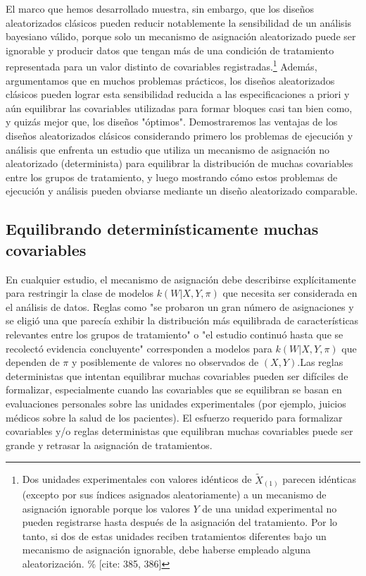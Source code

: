 \documentclass[12pt,a4paper]{article}
\begin{document}
El marco que hemos desarrollado muestra, sin embargo, que los diseños aleatorizados clásicos pueden reducir notablemente la sensibilidad de un análisis bayesiano válido, porque solo un mecanismo de asignación aleatorizado puede ser ignorable y producir datos que tengan más de una condición de tratamiento representada para un valor distinto de covariables registradas.\footnote{Dos unidades experimentales con valores idénticos de $\tilde{X}_{(1)}$ parecen idénticas (excepto por sus índices asignados aleatoriamente) a un mecanismo de asignación ignorable porque los valores $Y$ de una unidad experimental no pueden registrarse hasta después de la asignación del tratamiento. Por lo tanto, si dos de estas unidades reciben tratamientos diferentes bajo un mecanismo de asignación ignorable, debe haberse empleado alguna aleatorización. \% [cite: 385, 386]} Además, argumentamos que en muchos problemas prácticos, los diseños aleatorizados clásicos pueden lograr esta sensibilidad reducida a las especificaciones a priori y aún equilibrar las covariables utilizadas para formar bloques casi tan bien como, y quizás mejor que, los diseños "óptimos". Demostraremos las ventajas de los diseños aleatorizados clásicos considerando primero los problemas de ejecución y análisis que enfrenta un estudio que utiliza un mecanismo de asignación no aleatorizado (determinista) para equilibrar la distribución de muchas covariables entre los grupos de tratamiento, y luego mostrando cómo estos problemas de ejecución y análisis pueden obviarse mediante un diseño aleatorizado comparable.

\subsection{Equilibrando determinísticamente muchas covariables}

En cualquier estudio, el mecanismo de asignación debe describirse explícitamente para restringir la clase de modelos $k(W|X,Y,\pi)$ que necesita ser considerada en el análisis de datos. Reglas como "se probaron un gran número de asignaciones y se eligió una que parecía exhibir la distribución más equilibrada de características relevantes entre los grupos de tratamiento" o "el estudio continuó hasta que se recolectó evidencia concluyente" corresponden a modelos para $k(W|X,Y,\pi)$ que dependen de $\pi$ y posiblemente de valores no observados de $(X,Y)$.Las reglas deterministas que intentan equilibrar muchas covariables pueden ser difíciles de formalizar, especialmente cuando las covariables que se equilibran se basan en evaluaciones personales sobre las unidades experimentales (por ejemplo, juicios médicos sobre la salud de los pacientes). El esfuerzo requerido para formalizar covariables y/o reglas deterministas que equilibran muchas covariables puede ser grande y retrasar la asignación de tratamientos. 
\end{document}
